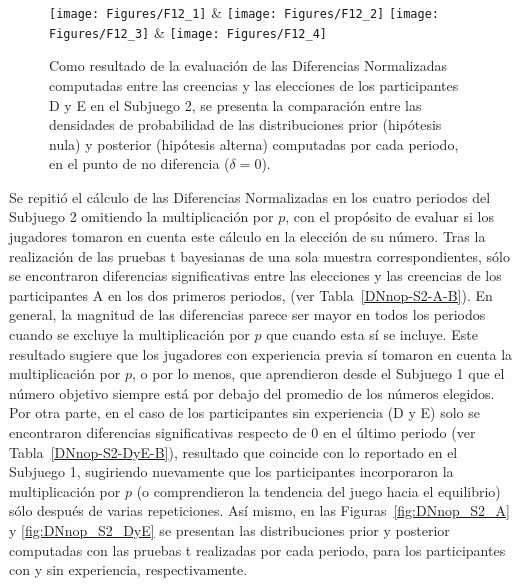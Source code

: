 \begin{figure}[h]
\centering
\texttt{[image: Figures/F12\_1]} & \texttt{[image: Figures/F12\_2]} 
\texttt{[image: Figures/F12\_3]} & \texttt{[image: Figures/F12\_4]} 
\decoRule
\caption[Evaluación de las Diferencias Normalizadas entre creencias y elecciones en los participantes D y E en el Subjuego 2 (Factor de Bayes)]{Como resultado de la evaluación de las Diferencias Normalizadas computadas entre las creencias y las elecciones de los participantes D y E en el Subjuego 2, se presenta la comparación entre las densidades de probabilidad de las distribuciones prior (hipótesis nula) y posterior (hipótesis alterna) computadas por cada periodo, en el punto de no diferencia ($\delta = 0$).}
\label{fig:DN_S2_DyE}
\end{figure}  

Se repitió el cálculo de las Diferencias Normalizadas en los cuatro periodos del Subjuego 2 omitiendo la multiplicación por $p$, con el propósito de evaluar si los jugadores tomaron en cuenta este cálculo en la elección de su número. Tras la realización de las pruebas t bayesianas de una sola muestra correspondientes,  sólo se encontraron diferencias significativas entre las elecciones y las creencias de los participantes A en los dos primeros  periodos, (ver Tabla~\ref{DNnop-S2-A-B}). En general, la magnitud de las diferencias parece ser mayor en todos los periodos cuando se excluye la multiplicación por $p$ que cuando esta sí se incluye. Este resultado sugiere que los jugadores con experiencia previa sí tomaron en cuenta la multiplicación por $p$, o por lo menos, que aprendieron desde el Subjuego 1 que el número objetivo siempre está por debajo del promedio de los números elegidos.\\

Por otra parte, en el caso de los participantes sin experiencia (D y E) solo se encontraron diferencias significativas respecto de 0 en el último periodo (ver Tabla~\ref{DNnop-S2-DyE-B}), resultado que coincide con lo reportado en el Subjuego 1, sugiriendo nuevamente que los participantes incorporaron la multiplicación por $p$ (o comprendieron la tendencia del juego hacia el equilibrio)  sólo después de varias repeticiones. Así mismo, en las Figuras~\ref{fig:DNnop_S2_A} y \ref{fig:DNnop_S2_DyE} se presentan las distribuciones prior y posterior computadas con las pruebas t realizadas por cada periodo, para los participantes con y sin experiencia, respectivamente.\\

